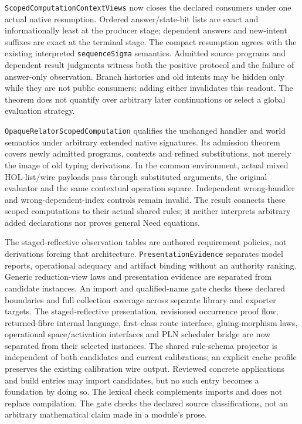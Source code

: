 \documentclass[11pt]{article}
\theoremstyle{definition}
\theoremstyle{remark}
\begin{document}
\texttt{ScopedComputationContextViews} now closes the declared consumers under
one actual native resumption. Ordered answer/state-bit lists are exact and
informationally least at the producer stage; dependent answers and new-intent
suffixes are exact at the terminal stage. The compact resumption agrees with
the existing interpreted \texttt{sequenceSigma} semantics. Admitted source
programs and dependent result judgments witness both the positive protocol
and the failure of answer-only observation. Branch histories and old intents
may be hidden only while they are not public consumers: adding either
invalidates this readout. The theorem does not quantify over arbitrary later
continuations or select a global evaluation strategy.

\texttt{OpaqueRelatorScopedComputation} qualifies the unchanged handler and
world semantics under arbitrary extended native signatures. Its admission
theorem covers newly admitted programs, contexts and refined substitutions,
not merely the image of old typing derivations. In the common environment,
actual mixed HOL-list/wire payloads pass through substituted arguments, the
original evaluator and the same contextual operation square. Independent
wrong-handler and wrong-dependent-index controls remain invalid. The result
connects these scoped computations to their actual shared rules; it neither
interprets arbitrary added declarations nor proves general Need equations.

The staged-reflective observation tables are authored requirement policies,
not derivations forcing that architecture. \texttt{PresentationEvidence}
separates model reports, operational adequacy and artifact binding without
an authority ranking. Generic reduction-view laws and presentation evidence
are separated from candidate instances. An import and qualified-name gate checks these
declared boundaries and full collection coverage across separate library and
exporter targets. The staged-reflective presentation, revisioned occurrence
proof flow, returned-fibre internal language, first-class route interface,
gluing-morphism laws, operational
space/activation interfaces and PLN scheduler bridge are now separated from
their selected instances. The shared rule-schema projector is independent of
both candidates and current calibrations; an explicit cache profile preserves
the existing calibration wire output. Reviewed concrete applications and build
entries may import candidates, but no such entry becomes a foundation by doing
so. The lexical check complements imports and does not replace compilation.
The gate checks the declared source classifications, not an arbitrary
mathematical claim made in a module's prose.
\end{document}
